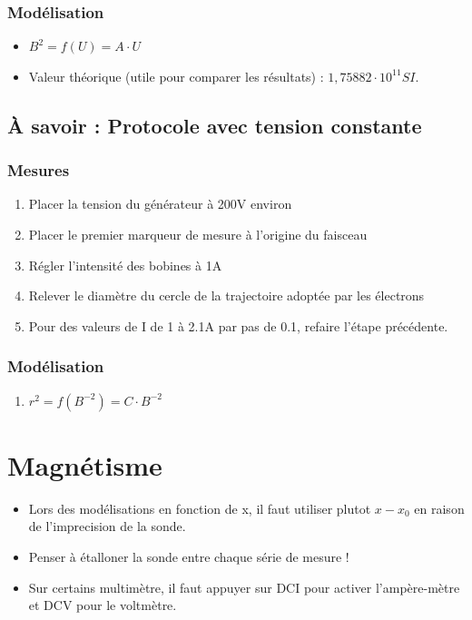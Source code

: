 \documentclass[french]{yLectureNote}
\begin{document}
\subsubsection{Modélisation}
\begin{itemize}
 \item $B^2 = f(U) = A\cdot U$
 \item Valeur théorique (utile pour comparer les résultats) : $1,75882 \cdot 10^{11} SI$.
\end{itemize}

\subsection{À savoir : Protocole avec tension constante}
\subsubsection{Mesures}
\begin{enumerate}
 \item Placer la tension du générateur à 200V environ
  \item Placer le premier marqueur de mesure à l'origine du faisceau
 \item Régler l'intensité des bobines à 1A
 \item Relever le diamètre du cercle de la trajectoire adoptée par les électrons
 \item Pour des valeurs de I de 1 à 2.1A par pas de 0.1, refaire l'étape précédente.
\end{enumerate}
\subsubsection{Modélisation}
\begin{enumerate}
 \item $r^2 = f(B^{-2}) = C\cdot B^{-2}$
\end{enumerate}
\section{Magnétisme}
\begin{itemize}
 \item Lors des modélisations en fonction de x, il faut utiliser plutot \(x-x_0\) en raison de l'imprecision de la sonde.
 \item Penser à étalloner la sonde entre chaque série de mesure !
 \item Sur certains multimètre, il faut appuyer sur DCI pour activer l'ampère-mètre et DCV pour le voltmètre.
\end{itemize}
\end{document}
